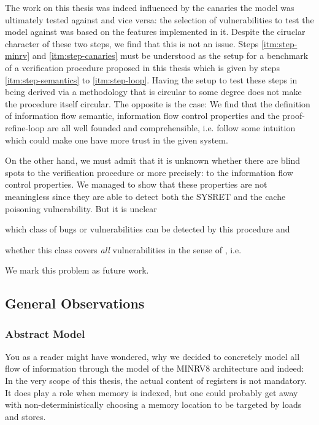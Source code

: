 The work on this thesis was indeed influenced by the canaries the model was ultimately tested against and vice versa: the selection of vulnerabilities to test the model against was based on the features implemented in it.
Despite the ciruclar character of these two steps, we find that this is not an issue.
Steps \ref{itm:step-minrv} and \ref{itm:step-canaries} must be understood as the setup for a benchmark of a verification procedure proposed in this thesis which is given by steps \ref{itm:step-semantics} to \ref{itm:step-loop}.
Having the setup to test these steps in being derived via a methodology that is circular to some degree does not make the procedure itself circular.
The opposite is the case:
We find that the definition of information flow semantic, information flow control properties and the proof-refine-loop are all well founded and comprehensible, i.e. follow some intuition which could make one have more trust in the given system.

On the other hand, we must admit that it is unknown whether there are blind spots to the verification procedure or more precisely: to the information flow control properties.
We managed to show that these properties are not meaningless since they are able to detect both the SYSRET and the cache poisoning vulnerability.
But it is unclear
\begin{enumerate*}[label=\alph*)]
    \item which class of bugs or vulnerabilities can be detected by this procedure and
    \item whether this class covers \textit{all} vulnerabilities in the sense of \citeauthor{Piano}, i.e. 
\end{enumerate*}
We mark this problem as future work.

\subsection{General Observations}
\label{sec:discuss-observations}

\subsubsection{Abstract Model}

You as a reader might have wondered, why we decided to concretely model all flow of information through the model of the MINRV8 architecture and indeed: In the very scope of this thesis, the actual content of registers is not mandatory.
It does play a role when memory is indexed, but one could probably get away with non-deterministically choosing a memory location to be targeted by loads and stores.

